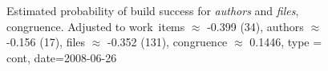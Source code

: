 \begin{figure}[t]
\centering
{}

\caption{Estimated probability of build success for \emph{authors} and \emph{files},  congruence. Adjusted to work~items $\approx$ -0.399 (34), authors $\approx$ -0.156 (17), files $\approx$ -0.352 (131), congruence $\approx$ 0.1446, type = cont, date=2008-06-26}
  \label{fig:weighted_congruence_authors_age}
\end{figure}



